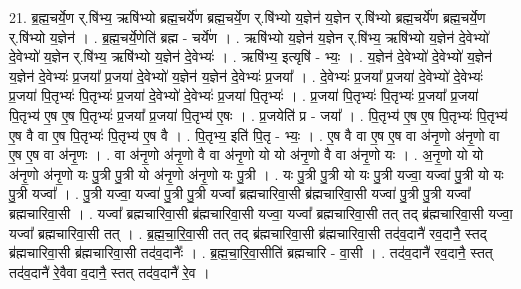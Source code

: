 \documentclass[17pt]{extarticle}
\begin{document}
21. ब्र॒ह्म॒चर्ये॒ण र्.षि॑भ्य॒ ऋषि॑भ्यो ब्रह्म॒चर्ये॑ण ब्रह्म॒चर्ये॒ण र्.षि॑भ्यो य॒ज्ञेन॑ य॒ज्ञेन र्.षि॑भ्यो ब्रह्म॒चर्ये॑ण ब्रह्म॒चर्ये॒ण र्.षि॑भ्यो य॒ज्ञेन॑ । . ब्र॒ह्म॒चर्ये॒णेति॑ ब्रह्म - चर्ये॑ण । . ऋषि॑भ्यो य॒ज्ञेन॑ य॒ज्ञेन र्.षि॑भ्य॒ ऋषि॑भ्यो य॒ज्ञेन॑ दे॒वेभ्यो॑ दे॒वेभ्यो॑ य॒ज्ञेन र्.षि॑भ्य॒ ऋषि॑भ्यो य॒ज्ञेन॑ दे॒वेभ्यः॑ । . ऋषि॑भ्य॒ इत्यृषि॑ - भ्यः॒ । . य॒ज्ञेन॑ दे॒वेभ्यो॑ दे॒वेभ्यो॑ य॒ज्ञेन॑ य॒ज्ञेन॑ दे॒वेभ्यः॑ प्र॒जया᳚ प्र॒जया॑ दे॒वेभ्यो॑ य॒ज्ञेन॑ य॒ज्ञेन॑ दे॒वेभ्यः॑ प्र॒जया᳚ । . दे॒वेभ्यः॑ प्र॒जया᳚ प्र॒जया॑ दे॒वेभ्यो॑ दे॒वेभ्यः॑ प्र॒जया॑ पि॒तृभ्यः॑ पि॒तृभ्यः॑ प्र॒जया॑ दे॒वेभ्यो॑ दे॒वेभ्यः॑ प्र॒जया॑ पि॒तृभ्यः॑ । . प्र॒जया॑ पि॒तृभ्यः॑ पि॒तृभ्यः॑ प्र॒जया᳚ प्र॒जया॑ पि॒तृभ्य॑ ए॒ष ए॒ष पि॒तृभ्यः॑ प्र॒जया᳚ प्र॒जया॑ पि॒तृभ्य॑ ए॒षः । . प्र॒जयेति॑ प्र - जया᳚ । . पि॒तृभ्य॑ ए॒ष ए॒ष पि॒तृभ्यः॑ पि॒तृभ्य॑ ए॒ष वै वा ए॒ष पि॒तृभ्यः॑ पि॒तृभ्य॑ ए॒ष वै । . पि॒तृभ्य॒ इति॑ पि॒तृ - भ्यः॒ । . ए॒ष वै वा ए॒ष ए॒ष वा अ॑नृ॒णो अ॑नृ॒णो वा ए॒ष ए॒ष वा अ॑नृ॒णः । . वा अ॑नृ॒णो अ॑नृ॒णो वै वा अ॑नृ॒णो यो यो अ॑नृ॒णो वै वा अ॑नृ॒णो यः । . अ॒नृ॒णो यो यो अ॑नृ॒णो अ॑नृ॒णो यः पु॒त्री पु॒त्री यो अ॑नृ॒णो अ॑नृ॒णो यः पु॒त्री । . यः पु॒त्री पु॒त्री यो यः पु॒त्री यज्वा॒ यज्वा॑ पु॒त्री यो यः पु॒त्री यज्वा᳚ । . पु॒त्री यज्वा॒ यज्वा॑ पु॒त्री पु॒त्री यज्वा᳚ ब्रह्मचारिवा॒सी ब्र॑ह्मचारिवा॒सी यज्वा॑ पु॒त्री पु॒त्री यज्वा᳚ ब्रह्मचारिवा॒सी । . यज्वा᳚ ब्रह्मचारिवा॒सी ब्र॑ह्मचारिवा॒सी यज्वा॒ यज्वा᳚ ब्रह्मचारिवा॒सी तत् तद् ब्र॑ह्मचारिवा॒सी यज्वा॒ यज्वा᳚ ब्रह्मचारिवा॒सी तत् । . ब्र॒ह्म॒चा॒रि॒वा॒सी तत् तद् ब्र॑ह्मचारिवा॒सी ब्र॑ह्मचारिवा॒सी तद॑व॒दानै॑ रव॒दानै॒ स्तद् ब्र॑ह्मचारिवा॒सी ब्र॑ह्मचारिवा॒सी तद॑व॒दानैः᳚ । . ब्र॒ह्म॒चा॒रि॒वा॒सीति॑ ब्रह्मचारि - वा॒सी । . तद॑व॒दानै॑ रव॒दानै॒ स्तत् तद॑व॒दानै॑ रे॒वैवा व॒दानै॒ स्तत् तद॑व॒दानै॑ रे॒व । \newline
\end{document}
